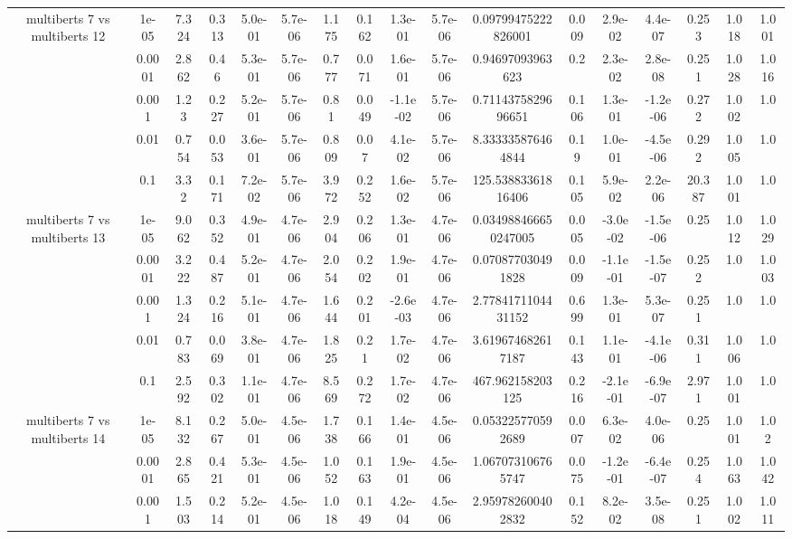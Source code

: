 \begin{tabular}{|c|c|c|c|c|c|c|c|c|c|c|c|c|c|c|c|c|}
\hline
\multirow{5}{*}{multiberts 7 vs multiberts 12} & 1e-05 & 7.324 & 0.313 & 5.0e-01 & 5.7e-06 & 1.175 & 0.162 & 1.3e-01 & 5.7e-06 & 0.09799475222826001 & 0.009 & 2.9e-02 & 4.4e-07 & 0.253 & 1.018 & 1.001 \\
 & 0.0001 & 2.862 & 0.46 & 5.3e-01 & 5.7e-06 & 0.777 & 0.071 & 1.6e-01 & 5.7e-06 & 0.94697093963623 & 0.2 & 2.3e-02 & 2.8e-08 & 0.251 & 1.028 & 1.016 \\
 & 0.001 & 1.23 & 0.227 & 5.2e-01 & 5.7e-06 & 0.81 & 0.049 & -1.1e-02 & 5.7e-06 & 0.7114375829696651 & 0.106 & 1.3e-01 & -1.2e-06 & 0.272 & 1.002 & 1.0 \\
 & 0.01 & 0.754 & 0.053 & 3.6e-01 & 5.7e-06 & 0.809 & 0.07 & 4.1e-02 & 5.7e-06 & 8.333335876464844 & 0.19 & 1.0e-01 & -4.5e-06 & 0.292 & 1.005 & 1.0 \\
 & 0.1 & 3.32 & 0.171 & 7.2e-02 & 5.7e-06 & 3.972 & 0.252 & 1.6e-02 & 5.7e-06 & 125.53883361816406 & 0.105 & 5.9e-02 & 2.2e-06 & 20.387 & 1.001 & 1.0 \\
\hline
\multirow{5}{*}{multiberts 7 vs multiberts 13} & 1e-05 & 9.062 & 0.352 & 4.9e-01 & 4.7e-06 & 2.904 & 0.206 & 1.3e-01 & 4.7e-06 & 0.034988466650247005 & 0.005 & -3.0e-02 & -1.5e-06 & 0.25 & 1.012 & 1.029 \\
 & 0.0001 & 3.222 & 0.487 & 5.2e-01 & 4.7e-06 & 2.054 & 0.202 & 1.9e-01 & 4.7e-06 & 0.070877030491828 & 0.009 & -1.1e-01 & -1.5e-07 & 0.252 & 1.0 & 1.003 \\
 & 0.001 & 1.324 & 0.216 & 5.1e-01 & 4.7e-06 & 1.644 & 0.201 & -2.6e-03 & 4.7e-06 & 2.7784171104431152 & 0.699 & 1.3e-01 & 5.3e-07 & 0.251 & 1.0 & 1.0 \\
 & 0.01 & 0.783 & 0.069 & 3.8e-01 & 4.7e-06 & 1.825 & 0.21 & 1.7e-02 & 4.7e-06 & 3.619674682617187 & 0.143 & 1.1e-01 & -4.1e-06 & 0.311 & 1.006 & 1.0 \\
 & 0.1 & 2.592 & 0.302 & 1.1e-01 & 4.7e-06 & 8.569 & 0.272 & 1.7e-02 & 4.7e-06 & 467.962158203125 & 0.216 & -2.1e-01 & -6.9e-07 & 2.971 & 1.001 & 1.0 \\
\hline
\multirow{5}{*}{multiberts 7 vs multiberts 14} & 1e-05 & 8.132 & 0.267 & 5.0e-01 & 4.5e-06 & 1.738 & 0.166 & 1.4e-01 & 4.5e-06 & 0.053225770592689 & 0.007 & 6.3e-02 & 4.0e-06 & 0.25 & 1.001 & 1.02 \\
 & 0.0001 & 2.865 & 0.421 & 5.3e-01 & 4.5e-06 & 1.052 & 0.163 & 1.9e-01 & 4.5e-06 & 1.067073106765747 & 0.075 & -1.2e-01 & -6.4e-07 & 0.254 & 1.063 & 1.042 \\
 & 0.001 & 1.503 & 0.214 & 5.2e-01 & 4.5e-06 & 1.018 & 0.149 & 4.2e-04 & 4.5e-06 & 2.959782600402832 & 0.152 & 8.2e-02 & 3.5e-08 & 0.251 & 1.002 & 1.011 \\

\end{tabular}
